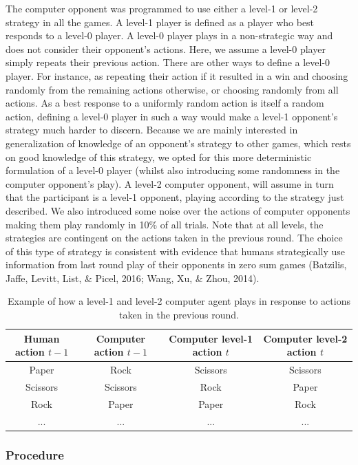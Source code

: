\documentclass[man,floatsintext]{apa6}
\begin{document}
The computer opponent was programmed to use either a level-1 or level-2 strategy in all the games. A level-1 player is defined as a player who best responds to a level-0 player. A level-0 player plays in a non-strategic way and does not consider their opponent's actions. Here, we assume a level-0 player simply repeats their previous action. There are other ways to define a level-0 player. For instance, as repeating their action if it resulted in a win and choosing randomly from the remaining actions otherwise, or choosing randomly from all actions. As a best response to a uniformly random action is itself a random action, defining a level-0 player in such a way would make a level-1 opponent's strategy much harder to discern. Because we are mainly interested in generalization of knowledge of an opponent's strategy to other games, which rests on good knowledge of this strategy, we opted for this more deterministic formulation of a level-0 player (whilst also introducing some randomness in the computer opponent's play). A level-2 computer opponent, will assume in turn that the participant is a level-1 opponent, playing according to the strategy just described. We also introduced some noise over the actions of computer opponents making them play randomly in 10\% of all trials. Note that at all levels, the strategies are contingent on the actions taken in the previous round. The choice of this type of strategy is consistent with evidence that humans strategically use information from last round play of their opponents in zero sum games (Batzilis, Jaffe, Levitt, List, \& Picel, 2016; Wang, Xu, \& Zhou, 2014).

\begin{table}[bth!]
\centering
\begin{tabular}{||c c | c c||} 
 \hline
 Human action $t-1$ & Computer action $t-1$  & Computer level-1 action $t$ & Computer level-2 action $t$ \\ [0.5ex] 
 \hline\hline
 Paper & Rock & Scissors & Scissors \\ 
 Scissors  & Scissors & Rock & Paper \\
 Rock & Paper & Paper & Rock \\
 ... & ... & ... & ... \\ [1ex] 
 \hline
\end{tabular}
\caption{Example of how a level-1 and level-2 computer agent plays in response to actions taken in the previous round.}
\label{table:1}
\end{table}

\hypertarget{procedure}{%
\subsubsection{Procedure}\label{procedure}}
\end{document}
